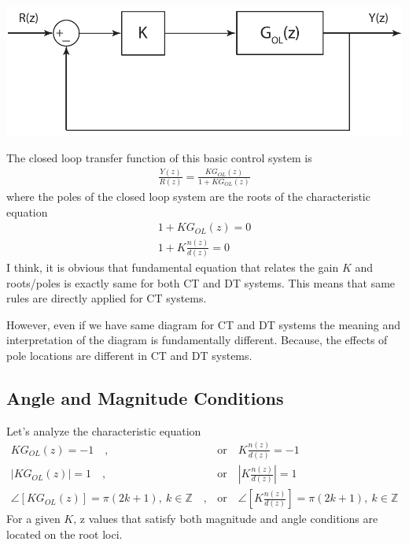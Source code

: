 \documentclass[twoside]{article}
\begin{document}
\begin{center}
\begin{minipage}[h]{0.7\linewidth}
    \begin{center}
      \includegraphics[width=\textwidth]{dist}
    \end{center}
\end{minipage}
\end{center}

The closed loop transfer function of this basic control system is
%
\begin{align*}
\frac{Y(z)}{R(z)} = \frac{K G_{OL}(z)}{1 + K G_{OL}(z)}
\end{align*}
%
where the poles of the closed loop system are
the roots of the characteristic equation 
%
\begin{align*}
1 + K G_{OL}(z) = 0 
\\
1 + K \frac{n(z)}{d(z)} = 0 
\end{align*}
%
I think, it is obvious that fundamental 
equation that relates the gain $K$ and roots/poles
is exactly same for both CT and DT systems.
This means that same rules are directly applied 
for CT systems. 

However, even if we have same diagram for CT and DT 
systems the meaning and interpretation of the diagram
is fundamentally different. Because, the effects of pole 
locations are different in CT and DT systems. 

\subsection*{Angle and Magnitude Conditions}

Let's analyze the characteristic equation 
%
\begin{align*}
K G_{OL}(z) = -1 \quad , &\mathrm{or} \quad K \frac{n(z)}{d(z)} = -1 
\\
| K G_{OL}(z) | = 1 \quad , &\mathrm{or} \quad \left| K \frac{n(z)}{d(z)} \right| = 1 
\\
\angle [ K G_{OL}(z) ] = \pi (2 k + 1) , \ k \in \mathbb{Z} \quad ,
  &\mathrm{or} \quad \angle \left[ K \frac{n(z)}{d(z)} \right] = \pi (2 k + 1), \ k \in \mathbb{Z} 
\end{align*}
%
For a given $K$, z values that satisfy both magnitude and angle
conditions are located on the root loci.
\end{document}
